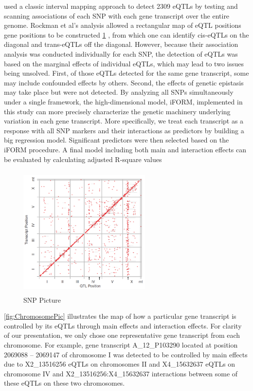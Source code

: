 \documentclass[11pt,]{book}
\theoremstyle{definition}
\theoremstyle{definition}
\theoremstyle{remark}
\begin{document}
\cite{rockman2010selection} used a classic interval mapping approach to
detect 2309 eQTLs by testing and scanning associations of each SNP with
each gene transcript over the entire genome. Rockman et al's analysis
allowed a rectangular map of eQTL positions gene positions to be
constructed \ref{fig:RockmanPic} , from which one can identify cis-eQTLs
on the diagonal and trans-eQTLs off the diagonal. However, because their
association analysis was conducted individually for each SNP, the
detection of eQTLs was based on the marginal effects of individual
eQTLs, which may lead to two issues being unsolved. First, of those
eQTLs detected for the same gene transcript, some may include confounded
effects by others. Second, the effects of genetic epistasis may take
place but were not detected. By analyzing all SNPs simultaneously under
a single framework, the high-dimensional model, iFORM, implemented in
this study can more precisely characterize the genetic machinery
underlying variation in each gene transcript. More specifically, we
treat each transcript as a response with all SNP markers and their
interactions as predictors by building a big regression model.
Significant predictors were then selected based on the iFORM procedure.
A final model including both main and interaction effects can be
evaluated by calculating adjusted R-square values

\begin{figure}

{\centering \includegraphics[width=250px,height=250px]{images/CElegansPicture} 

}

\caption{SNP Picture}\label{fig:RockmanPic}
\end{figure}

\ref{fig:ChromosomePic} illustrates the map of how a particular gene
transcript is controlled by its eQTLs through main effects and
interaction effects. For clarity of our presentation, we only chose one
representative gene transcript from each chromosome. For example, gene
transcript A\_12\_P103290 located at position 2069088 -- 2069147 of
chromosome I was detected to be controlled by main effects due to
X2\_13516256 eQTLs on chromosomes II and X4\_15632637 eQTLs on
chromosome IV and X2\_13516256:X4\_15632637 interactions between some of
these eQTLs on these two chromosomes.
\end{document}
